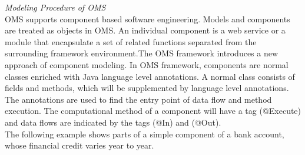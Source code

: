 \emph{Modeling Procedure of OMS}\\
OMS supports component based software engineering. Models and components are treated as objects in OMS. An individual component is a web service or a module that encapsulate a set of related functions separated from the surrounding framework environment.The OMS framework introduces a new approach of component modeling. In OMS framework, components are normal classes enriched with Java language level annotations. A normal class consists of fields and methods, which will be supplemented by language level annotations. The annotations are used to find the entry point of data flow and method execution. The computational method of a component will have a tag (@Execute) and data flows are indicated by the tags (@In) and (@Out).\\
The following example shows parts of a simple component of a bank account, whose financial credit varies year to year.\\

